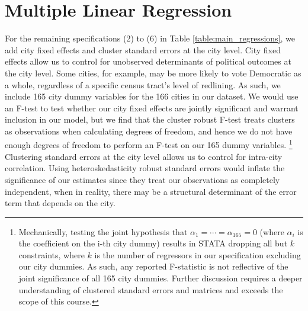 \documentclass{eco_375_paper}
\begin{document}
\section*{Multiple Linear Regression}
For the remaining specifications (2) to (6) in Table \ref{table:main_regressions}, we add city fixed effects and cluster standard errors at the city level. City fixed effects allow us to control for unobserved determinants of political outcomes at the city level. Some cities, for example, may be more likely to vote Democratic as a whole, regardless of a specific census tract’s level of redlining. As such, we include 165 city dummy variables for the 166 cities in our dataset. We would use an F-test to test whether our city fixed effects are jointly significant and warrant inclusion in our model, but we find that the cluster robust F-test treats clusters as observations when calculating degrees of freedom, and hence we do not have enough degrees of freedom to perform an F-test on our 165 dummy variables. \footnote{Mechanically, testing the joint hypothesis that $\alpha_1 = \cdots = \alpha_{165} = 0$ (where $\alpha_i$ is the coefficient on the i-th city dummy) results in STATA dropping all but $k$ constraints, where $k$ is the number of regressors in our specification excluding our city dummies. As such, any reported F-statistic is not reflective of the joint significance of all 165 city dummies. Further discussion requires a deeper understanding of clustered standard errors and matrices and exceeds the scope of this course.} Clustering standard errors at the city level allows us to control for intra-city correlation. Using heteroskedasticity robust standard errors would inflate the significance of our estimates since they treat our observations as completely independent, when in reality, there may be a structural determinant of the error term that depends on the city. 
\end{document}
